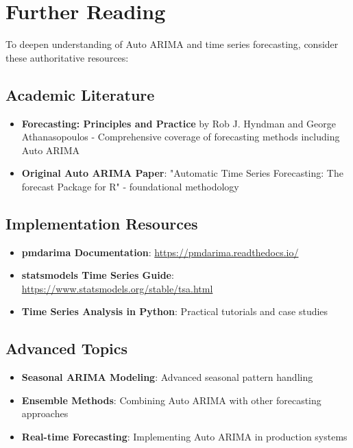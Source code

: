 \section{Further Reading}
\label{sec:further_reading}

To deepen understanding of Auto ARIMA and time series forecasting, consider these authoritative resources:

\subsection{Academic Literature}
\begin{itemize}
	\item \textbf{Forecasting: Principles and Practice} by Rob J. Hyndman and George Athanasopoulos - Comprehensive coverage of forecasting methods including Auto ARIMA \cite{HyndmanAthanasopoulos:2021}
	\item \textbf{Original Auto ARIMA Paper}: "Automatic Time Series Forecasting: The forecast Package for R" - foundational methodology \cite{HyndmanKhandakar:2008}
\end{itemize}

\subsection{Implementation Resources}
\begin{itemize}
	\item \textbf{pmdarima Documentation}: \url{https://pmdarima.readthedocs.io/}
	\item \textbf{statsmodels Time Series Guide}: \url{https://www.statsmodels.org/stable/tsa.html}
	\item \textbf{Time Series Analysis in Python}: Practical tutorials and case studies
\end{itemize}

\subsection{Advanced Topics}
\begin{itemize}
	\item \textbf{Seasonal ARIMA Modeling}: Advanced seasonal pattern handling
	\item \textbf{Ensemble Methods}: Combining Auto ARIMA with other forecasting approaches
	\item \textbf{Real-time Forecasting}: Implementing Auto ARIMA in production systems
\end{itemize}

